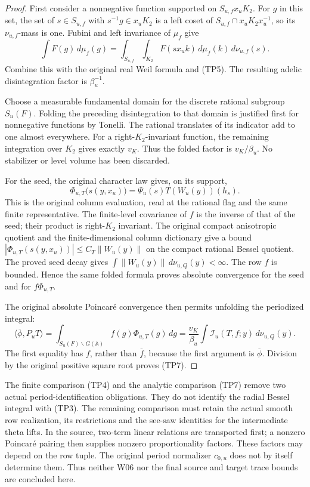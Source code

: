 \begin{proof}
First consider a nonnegative function supported on $S_{u,f}x_uK_2$.
For $g$ in this set, the set of $s\in S_{u,f}$ with
$s^{-1}g\in x_uK_2$ is a left coset of
$S_{u,f}\cap x_uK_2x_u^{-1}$, so its $\nu_{u,f}$-mass is one.
Fubini and left invariance of $\mu_f$ give
\[
 \int F(g)\,d\mu_f(g)=
 \int_{S_{u,f}}\int_{K_2}F(sx_uk)\,d\mu_f(k)\,d\nu_{u,f}(s).
 \tag{TP8}
\]
Combine this with the original real Weil formula and (TP5).
The resulting adelic disintegration factor is $\beta_u^{-1}$.

Choose a measurable fundamental domain for the discrete rational
subgroup $S_u(F)$. Folding the preceding disintegration to that
domain is justified first for nonnegative functions by Tonelli.
The rational translates of its indicator add to one almost
everywhere. For a right-$K_2$-invariant function, the remaining
integration over $K_2$ gives exactly $v_K$. Thus the folded factor
is $v_K/\beta_u$. No stabilizer or level volume has been discarded.

For the seed, the original character law gives, on its support,
\[
 \Phi_{u,T}\bigl(s(y,x_u)\bigr)
                       =\Psi_u(s)T(W_u(y))(h_s).
\]
This is the original column evaluation, read at the rational flag
and the same finite representative. The finite-level covariance
of $f$ is the inverse of that of the seed; their product is
right-$K_2$ invariant. The original compact anisotropic quotient
and the finite-dimensional column dictionary give a bound
$|\Phi_{u,T}(s(y,x_u))|\le C_T\|W_u(y)\|$ on the compact
rational Bessel quotient. The proved seed decay gives
$\int\|W_u(y)\|\,d\nu_{u,Q}(y)<\infty$.
The row $f$ is bounded. Hence the same folded formula proves
absolute convergence for the seed and for $f\Phi_{u,T}$.

The original absolute Poincar\'e convergence then permits unfolding
the periodized integral:
\[
 \langle\overline\phi,P_uT\rangle
  =\int_{S_u(F)\backslash G(\mathbb A)}f(g)\Phi_{u,T}(g)\,dg
  =\frac{v_K}{\beta_u}
                        \int\mathcal I_u(T,f;y)\,d\nu_{u,Q}(y).
\]
The first equality has $f$, rather than $\overline f$, because the
first argument is $\overline\phi$. Division by the original
positive square root proves (TP7).
\end{proof}

The finite comparison (TP4) and the analytic comparison (TP7) remove
two actual period-identification obligations. They do not identify
the radial Bessel integral with (TP3). The remaining comparison must
retain the actual smooth row realization, its restrictions and the
see-saw identities for the intermediate theta lifts. In the source,
two-term linear relations are transported first; a nonzero Poincar\'e
pairing then supplies nonzero proportionality factors. These factors
may depend on the row tuple. The original period normalizer $c_{0,u}$
does not by itself determine them. Thus neither W06 nor the final
source and target trace bounds are concluded here.
